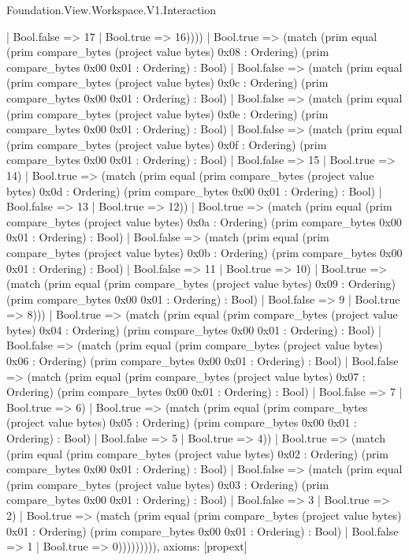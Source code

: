 \begin{lexlean}{Foundation.View.Workspace.V1.Interaction}
\begin{semanticmodule}
{                    | Bool.false => 17
                    | Bool.true => 16))))
            | Bool.true => (match (prim equal (prim compare_bytes (project value bytes) 0x08 : Ordering) (prim compare_bytes 0x00 0x01 : Ordering) : Bool)
              | Bool.false => (match (prim equal (prim compare_bytes (project value bytes) 0x0c : Ordering) (prim compare_bytes 0x00 0x01 : Ordering) : Bool)
                | Bool.false => (match (prim equal (prim compare_bytes (project value bytes) 0x0e : Ordering) (prim compare_bytes 0x00 0x01 : Ordering) : Bool)
                  | Bool.false => (match (prim equal (prim compare_bytes (project value bytes) 0x0f : Ordering) (prim compare_bytes 0x00 0x01 : Ordering) : Bool)
                    | Bool.false => 15
                    | Bool.true => 14)
                  | Bool.true => (match (prim equal (prim compare_bytes (project value bytes) 0x0d : Ordering) (prim compare_bytes 0x00 0x01 : Ordering) : Bool)
                    | Bool.false => 13
                    | Bool.true => 12))
                | Bool.true => (match (prim equal (prim compare_bytes (project value bytes) 0x0a : Ordering) (prim compare_bytes 0x00 0x01 : Ordering) : Bool)
                  | Bool.false => (match (prim equal (prim compare_bytes (project value bytes) 0x0b : Ordering) (prim compare_bytes 0x00 0x01 : Ordering) : Bool)
                    | Bool.false => 11
                    | Bool.true => 10)
                  | Bool.true => (match (prim equal (prim compare_bytes (project value bytes) 0x09 : Ordering) (prim compare_bytes 0x00 0x01 : Ordering) : Bool)
                    | Bool.false => 9
                    | Bool.true => 8)))
              | Bool.true => (match (prim equal (prim compare_bytes (project value bytes) 0x04 : Ordering) (prim compare_bytes 0x00 0x01 : Ordering) : Bool)
                | Bool.false => (match (prim equal (prim compare_bytes (project value bytes) 0x06 : Ordering) (prim compare_bytes 0x00 0x01 : Ordering) : Bool)
                  | Bool.false => (match (prim equal (prim compare_bytes (project value bytes) 0x07 : Ordering) (prim compare_bytes 0x00 0x01 : Ordering) : Bool)
                    | Bool.false => 7
                    | Bool.true => 6)
                  | Bool.true => (match (prim equal (prim compare_bytes (project value bytes) 0x05 : Ordering) (prim compare_bytes 0x00 0x01 : Ordering) : Bool)
                    | Bool.false => 5
                    | Bool.true => 4))
                | Bool.true => (match (prim equal (prim compare_bytes (project value bytes) 0x02 : Ordering) (prim compare_bytes 0x00 0x01 : Ordering) : Bool)
                  | Bool.false => (match (prim equal (prim compare_bytes (project value bytes) 0x03 : Ordering) (prim compare_bytes 0x00 0x01 : Ordering) : Bool)
                    | Bool.false => 3
                    | Bool.true => 2)
                  | Bool.true => (match (prim equal (prim compare_bytes (project value bytes) 0x01 : Ordering) (prim compare_bytes 0x00 0x01 : Ordering) : Bool)
                    | Bool.false => 1
                    | Bool.true => 0))))))))),
  axioms: [propext]
}


\end{semanticmodule}
\end{lexlean}
